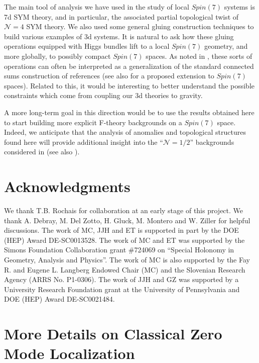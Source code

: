 \documentclass[12pt]{article}%
\numberwithin{equation}{section}
\renewcommand{\(}{\left(}
\renewcommand{\)}{\right)}
\renewcommand{\[}{\left[}
\renewcommand{\]}{\right]}
\begin{document}
The main tool of analysis we have used in the study of local $Spin(7)$ systems is 7d SYM theory, and in particular,
the associated partial topological twist of $\mathcal{N} = 4 $ SYM theory. We also used some general gluing construction techniques
to build various examples of 3d systems. It is natural to ask how these gluing operations equipped with Higgs bundles
lift to a local $Spin(7)$ geometry, and more globally, to possibly compact $Spin(7)$ spaces.
As noted in \cite{Cvetic:2020piw}, these sorts of operations can often
be interpreted as a generalization of the standard connected sums
construction of references \cite{Kovalev:2001zr, haskins2014asymptotically}
(see also \cite{Braun:2018joh} for a proposed extension to $Spin(7)$ spaces).
Related to this, it would be interesting to better understand
the possible constraints which come from coupling our 3d theories
to gravity.

A more long-term goal in this direction would be to use the results obtained here to start building more explicit F-theory backgrounds on a
$Spin(7)$ space. Indeed, we anticipate that the analysis of anomalies and topological structures found here will provide additional insight into the ``$\mathcal{N} = 1/2$'' backgrounds considered in \cite{Heckman:2018mxl, Heckman:2019dsj}
(see also \cite{Bonetti:2013fma, Bonetti:2013nka}).


\newpage

\section*{Acknowledgments}

We thank T.B. Rochais for collaboration at an early stage of this project.
We thank A. Debray, M. Del Zotto, H. Gluck, M. Montero and W. Ziller for helpful discussions.
The work of MC, JJH and ET is supported in part by the DOE (HEP) Award
DE-SC0013528. The work of MC and ET was supported by the
Simons Foundation Collaboration grant \#724069 on ``Special Holonomy in Geometry, Analysis and Physics''.
The work of MC is also supported by the Fay R. and Eugene L. Langberg Endowed Chair (MC) and the Slovenian
Research Agency (ARRS No. P1-0306).
The work of JJH and GZ was supported by a University Research Foundation
grant at the University of Pennsylvania and DOE (HEP) Award DE-SC0021484.


\appendix


\section{More Details on Classical Zero Mode Localization\label{app:MOREZERO}}
\end{document}
